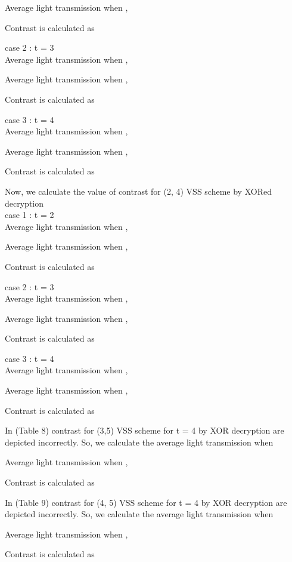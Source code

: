 Average light transmission when , 

Contrast is calculated as  

case 2 : t = 3\\
Average light transmission when ,

Average light transmission when ,

Contrast is calculated as  

case 3 : t = 4\\
Average light transmission when ,

Average light transmission when ,

Contrast is calculated as  

Now, we calculate the value of contrast for (2, 4) VSS scheme by XORed decryption\\
case 1 : t = 2\\  
Average light transmission when , 

Average light transmission when ,

Contrast is calculated as  

case 2 : t = 3\\
Average light transmission when ,

Average light transmission when ,

Contrast is calculated as  

case 3 : t = 4\\
Average light transmission when ,

Average light transmission when ,

Contrast is calculated as  

In \cite{Wu201348}(Table 8) contrast for (3,5) VSS scheme for t = 4 by XOR decryption are depicted incorrectly. So, we calculate the average light transmission when 

Average light transmission when ,

Contrast is calculated as  

In \cite{Wu201348}(Table 9) contrast for (4, 5) VSS scheme for t = 4 by XOR decryption are depicted incorrectly. So, we calculate the average light transmission when 

Average light transmission when ,

Contrast is calculated as  
